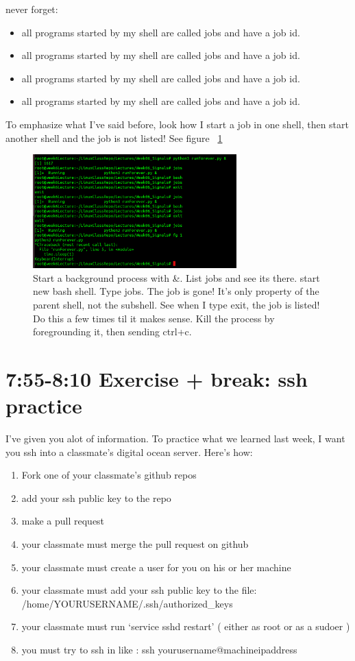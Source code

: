 \documentclass[8pt]{article}
\begin{document}
never forget:

\begin{itemize}
\item all programs started by my shell are called jobs and have a job id.
\item all programs started by my shell are called jobs and have a job id.
\item all programs started by my shell are called jobs and have a job id.
\item all programs started by my shell are called jobs and have a job id.
\end{itemize}

To emphasize what I've said before, look how I start a job in one shell, then
start another shell and the job is not listed! See figure ~\ref{fig:jobs}

\begin{figure}[ht]
	\centering
	\includegraphics[width=0.7\textwidth]{Images/jobsAndBashShells.png}
	\caption{Start a background process with \&. List jobs and see its there.
start new bash shell. Type jobs. The job is gone! It's only property of the
parent shell, not the subshell. See when I type exit, the job is listed! Do this
a few times til it makes sense. Kill the process by foregrounding it, then
sending ctrl+c.}
	\label{fig:jobs}
\end{figure}


\section{{\color{red} 7:55-8:10 Exercise + break: ssh practice}}

I've given you alot of information. To practice what we learned last week, I
want you ssh into a classmate's digital ocean server. Here's how:

\begin{enumerate}
\item Fork one of your classmate's github repos
\item add your ssh public key to the repo
\item make a pull request
\item your classmate must merge the pull request on github
\item your classmate must create a user for you on his or her machine
\item your classmate must add your ssh public key to the file:
/home/YOURUSERNAME/.ssh/authorized\_keys
\item your classmate must run `service sshd restart' ( either as root or as a
sudoer )
\item you must try to ssh in like : ssh yourusername@machineipaddress
\end{enumerate}
\end{document}
